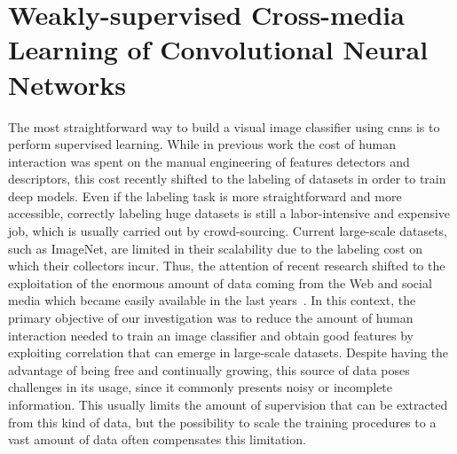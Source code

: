 
\graphicspath{{img/vsa/}}

\newcommand{\BTSA}{B-T4SA}
\newcommand{\ourFtAlex}{Hybrid-T4SA}
\newcommand{\ourFtVGG}{VGG-T4SA}

\chapter{Weakly-supervised Cross-media Learning of Convolutional Neural Networks}
\label{ch:cross-media}

The most straightforward way to build a visual image classifier using \glspl{cnn} is to perform supervised learning.
While in previous work the cost of human interaction was spent on the manual engineering of features detectors and descriptors, this cost recently shifted to the labeling of datasets in order to train deep models.
Even if the labeling task is more straightforward and more accessible, correctly labeling huge datasets is still a labor-intensive and expensive job, which is usually carried out by crowd-sourcing.
Current large-scale datasets, such as ImageNet, are limited in their scalability due to the labeling cost on which their collectors incur.
Thus, the attention of recent research shifted to the exploitation of the enormous amount of data coming from the Web and social media which became easily available in the last years~\cite{sun2017revisiting,mahajan2018exploring}.
In this context, the primary objective of our investigation was to reduce the amount of human interaction needed to train an image classifier and obtain good features by exploiting correlation that can emerge in large-scale datasets.
Despite having the advantage of being free and continually growing, this source of data poses challenges in its usage, since it commonly presents noisy or incomplete information.
This usually limits the amount of supervision that can be extracted from this kind of data, but the possibility to scale the training procedures to a vast amount of data often compensates this limitation.

